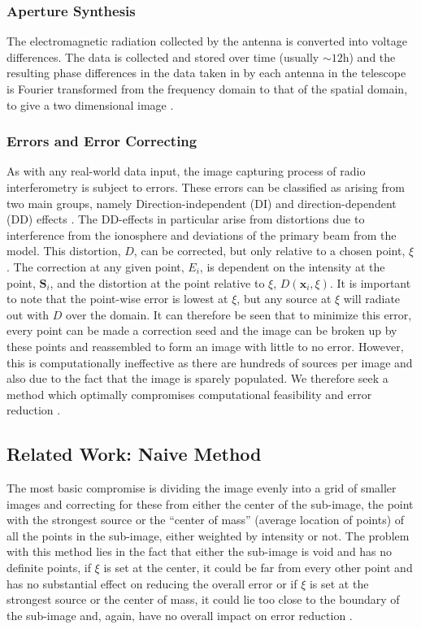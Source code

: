 \subsubsection{Aperture Synthesis}\label{ra:ssec:rii}
The electromagnetic radiation collected by the antenna is converted into voltage differences. The data is collected and stored over time (usually $\sim12$h) and the resulting phase differences in the data taken in by each antenna in the telescope is Fourier transformed from the frequency domain to that of the spatial domain, to give a two dimensional image \citep{sault1994multi}.
%
\subsubsection{Errors and Error Correcting}\label{ra:ssec:eec}
As with any real-world data input, the image capturing process of radio interferometry is subject to errors. These errors can be classified as arising from two main groups, namely Direction-independent (DI) and direction-dependent (DD) effects \citep{smirnov2015radio}. The DD-effects in particular arise from distortions due to interference from the ionosphere and deviations of the primary beam from the model. This distortion, $D$, can be corrected, but only relative to a chosen point, $\xi$. The correction at any given point, $E_i$, is dependent on the intensity at the point, $\boldsymbol{S}_i$, and the distortion at the point relative to $\xi$, $D(\boldsymbol{x}_i,\xi)$. It is important to note that the point-wise error is lowest at $\xi$, but any source at $\xi$ will radiate out with $D$ over the domain. It can therefore be seen that to minimize this error, every point can be made a correction seed and the image can be broken up by these points and reassembled to form an image with little to no error. However, this is computationally ineffective as there are hundreds of sources per image and also due to the fact that the image is sparely populated. We therefore seek a method which optimally compromises computational feasibility and error reduction \citep{oleg}.
\subsection{Related Work: Naive Method}
The most basic compromise is dividing the image evenly into a grid of smaller images and correcting for these from either the center of the sub-image, the point with the strongest source or the ``center of mass'' (average location of points) of all the points in the sub-image, either weighted by intensity or not. The problem with this method lies in the fact that either the sub-image is void and has no definite points, if $\xi$ is set at the center, it could be far from every other point and has no substantial effect on reducing the overall error or if $\xi$ is set at the strongest source or the center of mass, it could lie too close to the boundary of the sub-image and, again, have no overall impact on error reduction \cite{oleg}.



